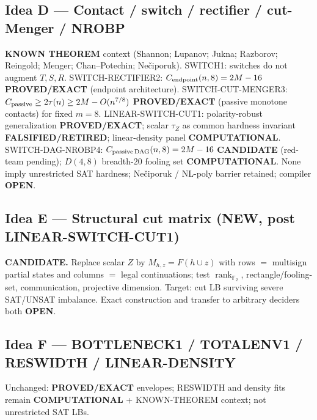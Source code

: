 \documentclass[11pt]{article}
\begin{document}
\subsection*{Idea D --- Contact / switch / rectifier / cut-Menger / NROBP}
\textbf{KNOWN THEOREM} context (Shannon; Lupanov; Jukna; Razborov; Reingold; Menger; Chan--Potechin; Ne\v{c}iporuk).
SWITCH1: switches do not augment $T,S,R$.
SWITCH-RECTIFIER2: $C_{\rm endpoint}(n,8)=2M-16$ \textbf{PROVED/EXACT} (endpoint architecture).
SWITCH-CUT-MENGER3: $C_{\rm passive}\ge 2\tau(n)\ge 2M-O(n^{7/8})$ \textbf{PROVED/EXACT}
(passive monotone contacts) for fixed $m=8$.
LINEAR-SWITCH-CUT1: polarity-robust generalization \textbf{PROVED/EXACT}; scalar $\tau_Z$ as
common hardness invariant \textbf{FALSIFIED/RETIRED}; linear-density panel \textbf{COMPUTATIONAL}.
SWITCH-DAG-NROBP4: $C_{\rm passive\,DAG}(n,8)=2M-16$ \textbf{CANDIDATE} (red-team pending);
$D(4,8)$ breadth-$20$ fooling set \textbf{COMPUTATIONAL}.
None imply unrestricted SAT hardness; Ne\v{c}iporuk / NL-poly barrier retained; compiler \textbf{OPEN}.

\subsection*{Idea E --- Structural cut matrix (NEW, post LINEAR-SWITCH-CUT1)}
\textbf{CANDIDATE.} Replace scalar $Z$ by
$M_{h,z}=F(h\cup z)$ with rows $=$ multisign partial states and columns $=$ legal continuations;
test $\operatorname{rank}_{\mathbb F_2}$, rectangle/fooling-set, communication, projective dimension.
Target: cut LB surviving severe SAT/UNSAT imbalance. Exact construction and transfer to
arbitrary deciders both \textbf{OPEN}.

\subsection*{Idea F --- BOTTLENECK1 / TOTALENV1 / RESWIDTH / LINEAR-DENSITY}
Unchanged: \textbf{PROVED/EXACT} envelopes; RESWIDTH and density fits remain
\textbf{COMPUTATIONAL} + KNOWN-THEOREM context; not unrestricted SAT LBs.
\end{document}
